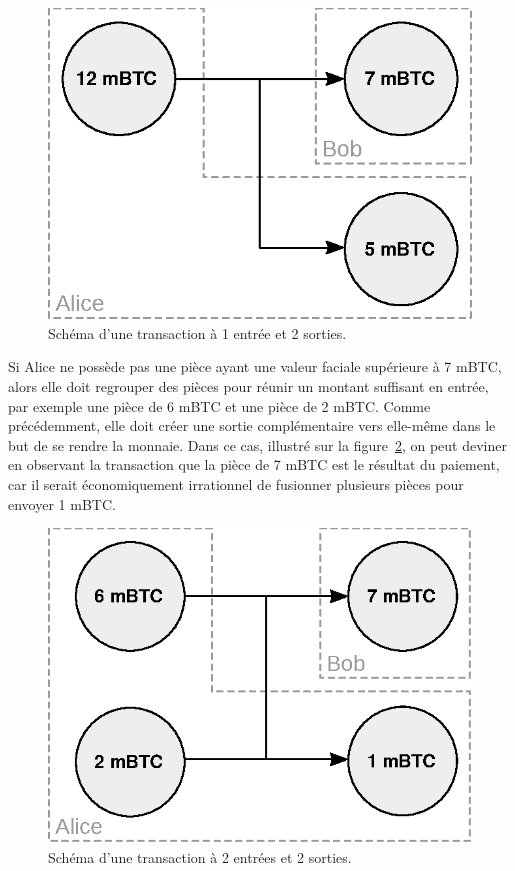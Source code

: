 \begin{figure}[ht]
  \centering
  \includegraphics[scale=0.75]{img/transaction-1i-2o.eps}
  \caption{Schéma d'une transaction à 1 entrée et 2 sorties.}
  \label{fig:transaction-1i-2o}
\end{figure}

Si Alice ne possède pas une pièce ayant une valeur faciale supérieure à 7 mBTC, alors elle doit regrouper des pièces pour réunir un montant suffisant en entrée, par exemple une pièce de 6 mBTC et une pièce de 2 mBTC. Comme précédemment, elle doit créer une sortie complémentaire vers elle-même dans le but de se rendre la monnaie. Dans ce cas, illustré sur la figure~\ref{fig:transaction-2i-2o}, on peut deviner en observant la transaction que la pièce de 7 mBTC est le résultat du paiement, car il serait économiquement irrationnel de fusionner plusieurs pièces pour envoyer 1 mBTC.

\begin{figure}[ht]
  \centering
  \includegraphics[scale=0.75]{img/transaction-2i-2o.eps}
  \caption{Schéma d'une transaction à 2 entrées et 2 sorties.}
  \label{fig:transaction-2i-2o}
\end{figure}

